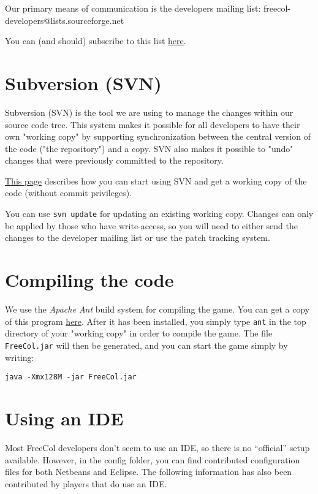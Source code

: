 \documentclass[12pt]{book}
\begin{document}
Our primary means of communication is the developers mailing list:
freecol-developers@lists.sourceforge.net

You can (and should) subscribe to this list
\href{http://lists.sourceforge.net/lists/listinfo/freecol-developers}{here}.


\hypertarget{Subversion (SVN)}{\section{Subversion (SVN)}}

Subversion (SVN) is the tool we are using to
manage the changes within our source code tree. This system
makes it possible for all developers to have their own
"working copy" by supporting synchronization between the
central version of the code ("the repository") and a copy.
SVN also makes it possible to "undo" changes that were
previously committed to the repository.

\href{http://www.freecol.org/index.php?section=17}{This page}
describes how you can start using SVN and get a working copy of the
code (without commit privileges).

You can use \verb+svn update+ for updating an existing working
copy. Changes can only be applied by those who have write-access, so
you will need to either send the changes to the developer mailing list
or use the patch tracking system.


\hypertarget{Compiling the code}{\section{Compiling the code}}

We use the \textit{Apache Ant} build system for compiling the
game. You can get a copy of this program
\href{http://ant.apache.org}{here}. After it has been installed, you
simply type \verb+ant+ in the top directory of your "working copy" in
order to compile the game.  The file \verb+FreeCol.jar+ will then be
generated, and you can start the game simply by writing:

\verb+java -Xmx128M -jar FreeCol.jar+


\hypertarget{Using an IDE}{\section{Using an IDE}}

Most FreeCol developers don't seem to use an IDE, so there is no
``official'' setup available. However, in the config folder, you can
find contributed configuration files for both Netbeans and Eclipse.
The following information has also been contributed by players that do
use an IDE.
\end{document}
